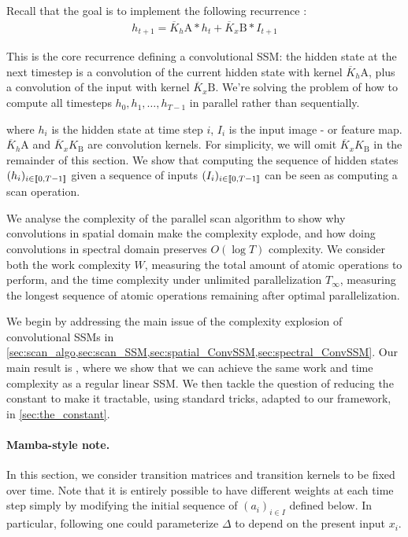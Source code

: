 
Recall that the goal is to implement the following recurrence :
\begin{align}
\label{eq:convssm_recurrence}
    h_{t+1}=\overline{K}_h{\mathrm{A}} \ast h_t + \overline{K}_x{\mathrm{B}}\ast I_{t+1}
\end{align}

\begin{ThomasAnnotation}
This is the core recurrence defining a convolutional SSM: the hidden state at the next timestep is a convolution of the current hidden state with kernel $\overline{K}_h\mathrm{A}$, plus a convolution of the input with kernel $\overline{K}_x\mathrm{B}$. We're solving the problem of how to compute all timesteps $h_0, h_1, \ldots, h_{T-1}$ in parallel rather than sequentially.
\end{ThomasAnnotation}

where $h_i$ is the hidden state at time step $i$, $I_i$ is the input image - or feature map. $\overline{K}_h{\mathrm{A}}$ and $\overline{K}_xK_{\mathrm{B}}$ are convolution kernels. For simplicity, we will omit $\overline{K}_xK_{\mathrm{B}}$ in the remainder of this section. We show that computing the sequence of hidden states $(h_i)_{i\in\llbracket 0, T-1 \rrbracket}$ given a sequence of inputs $(I_i)_{i\in\llbracket 0, T-1 \rrbracket}$ can be seen as computing a scan operation.

We analyse the complexity of the parallel scan algorithm to show why convolutions in spatial domain make the complexity explode, and how doing convolutions in spectral domain preserves $O(\log T)$ complexity. We consider both the work complexity $W$, measuring the total amount of atomic operations to perform, and the time complexity under unlimited parallelization $T_\infty$, measuring the longest sequence of atomic operations remaining after optimal parallelization.

We begin by addressing the main issue of the complexity explosion of convolutional SSMs in \cref{sec:scan_algo,sec:scan_SSM,sec:spatial_ConvSSM,sec:spectral_ConvSSM}. Our main result is , where we show that we can achieve the same work and time complexity as a regular linear SSM. We then tackle the question of reducing the constant to make it tractable, using standard tricks, adapted to our framework, in \cref{sec:the_constant}.

\paragraph{Mamba-style note.} In this section, we consider transition matrices and transition kernels to be fixed over time. Note that it is entirely possible to have different weights at each time step simply by modifying the initial sequence of $(a_i)_{i\in I}$ defined below. In particular, following \citet{TODO:Mamba} one could parameterize $\Delta$ to depend on the present input $x_i$.

